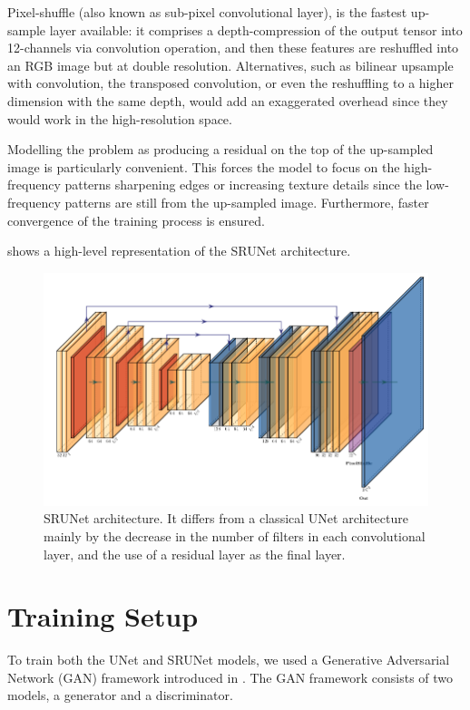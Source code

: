 Pixel-shuffle (also known as sub-pixel convolutional layer), is the fastest up-sample layer available: it comprises a depth-compression of the output tensor into 12-channels via convolution operation, and then these features are reshuffled into an RGB image but at double resolution. Alternatives, such as bilinear upsample with convolution, the transposed convolution, or even the reshuffling to a higher dimension with the same depth, would add an exaggerated overhead since they would work in the high-resolution space.

Modelling the problem as producing a residual on the top of the up-sampled image is particularly convenient. This forces the model to focus on the high-frequency patterns sharpening edges or increasing texture details since the low-frequency patterns are still from the up-sampled image. Furthermore, faster convergence of the training process is ensured.
 
 shows a high-level representation of the SRUNet architecture.

\begin{figure}[ht]
\centering
\includegraphics[width=1.0\textwidth]{static/srunet_architecture.png}
\caption{SRUNet architecture. It differs from a classical UNet architecture mainly by the decrease in the number of filters in each convolutional layer, and the use of a residual layer as the final layer.}
\label{fig:srunet}
\end{figure}

\section{Training Setup}
\label{sec:training-setup}

To train both the UNet and SRUNet models, we used a Generative Adversarial Network (GAN) framework introduced in \cite{goodfellow2020generative}. The GAN framework consists of two models, a generator and a discriminator.

